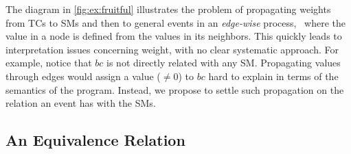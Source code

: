 \documentclass[x11names]{tlp}
\begin{document}
The diagram in \cref{fig:ex:fruitful} illustrates the problem of propagating weights from \aclp{TC} to \aclp{SM} and then to general events in an \emph{edge-wise} process, \ie\ where the value in a node is defined from the values in its neighbors.
This quickly leads to interpretation issues concerning weight, with no clear systematic approach.
For example, notice that $bc$ is not directly related with any \acl{SM}.
Propagating values through edges would assign a value ($\not= 0$) to $bc$ hard to explain in terms of the semantics of the program.
Instead, we propose to settle such propagation on the relation an event has with the \aclp{SM}.

\subsection{An Equivalence Relation}
\label{subsec:equivalence.relation}
\end{document}
